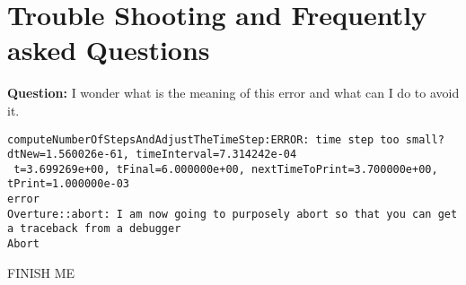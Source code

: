 \documentclass{article}
\newcommand{\bogus}[1]{}  %
\begin{document}
\section{Trouble Shooting and Frequently asked Questions}

{\bf Question:} I wonder what is the meaning of this error and what can I do to avoid it.
\begin{verbatim}
computeNumberOfStepsAndAdjustTheTimeStep:ERROR: time step too small? dtNew=1.560026e-61, timeInterval=7.314242e-04
 t=3.699269e+00, tFinal=6.000000e+00, nextTimeToPrint=3.700000e+00, tPrint=1.000000e-03
error
Overture::abort: I am now going to purposely abort so that you can get a traceback from a debugger
Abort
\end{verbatim}

FINISH ME

\clearpage



\bogus{
\subsection{Using PETSc and cgcns}\index{PETSc}

  PETSc, the Portable Extensible Toolkit for Scientific computations\cite{petsc-manual},
can be used in cgcns to solve implicit systems. 

To use PETSc you should 
\begin{enumerate}
 \item build  PETSc on your machine.
\item define the PETSC\_LIB and PETSC\_ARCH environmental variables (as required to use PETSc normally).
\item edit the file {\tt cg/ins/Makfile} and turn on the PETSc option. 
\end{enumerate}
}

\vfill\eject



\printindex
\end{document}
